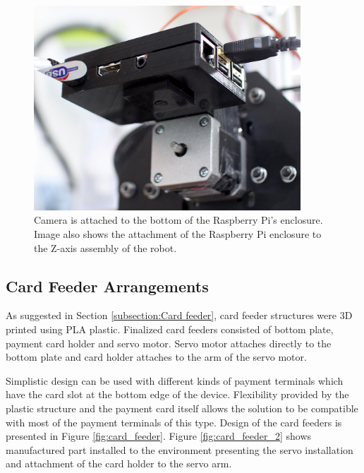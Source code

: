 \begin{figure}[ht]
  \begin{center}
    \includegraphics[width=10cm]{images/camera.jpg}
    \caption{Camera is attached to the bottom of the Raspberry Pi's enclosure. Image also shows the attachment of the Raspberry Pi enclosure to the Z-axis assembly of the robot.}
    \label{fig:camera}
  \end{center}
\end{figure}
\FloatBarrier


\subsection{Card Feeder Arrangements}
\label{subsection:Card feeder arrangements}

As suggested in Section \ref{subsection:Card feeder}, card feeder structures were 3D printed using PLA plastic. Finalized card feeders consisted of bottom plate, payment card holder and servo motor. Servo motor attaches directly to the bottom plate and card holder attaches to the arm of the servo motor.

Simplistic design can be used with different kinds of payment terminals which have the card slot at the bottom edge of the device. Flexibility provided by the plastic structure and the payment card itself allows the solution to be compatible with most of the payment terminals of this type. Design of the card feeders is presented in Figure \ref{fig:card_feeder}. Figure \ref{fig:card_feeder_2} shows manufactured part installed to the environment presenting the servo installation and attachment of the card holder to the servo arm.

